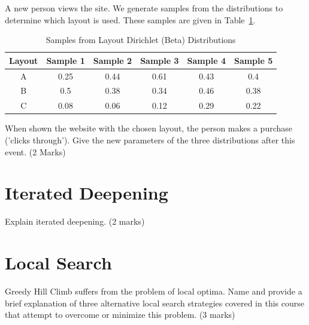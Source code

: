 \documentclass{article}
\begin{document}
A new person views the site. We generate samples from the distributions to determine which layout is used. These samples are given in Table~\ref{MABO2}.
\begin{table}[h!]
\caption{Samples from Layout Dirichlet (Beta) Distributions}
\label{MABO2}
\begin{center}
\begin{tabular}{ |c|c|c|c|c|c| } 
\hline
 Layout & Sample 1 & Sample 2 & Sample 3 & Sample 4 & Sample 5 \\
\hline
A &  0.25  &  0.44  &  0.61  &  0.43  &  0.4 \\
B &  0.5  &  0.38  &  0.34  &  0.46  &  0.38 \\
C &  0.08  &  0.06  &  0.12  &  0.29  &  0.22 \\
\hline
\end{tabular}
\end{center}
\end{table}


When shown the website with the chosen layout, the person makes a purchase ('clicks through'). Give the new parameters of the three distributions after this event. (2 Marks)
\clearpage
\section{ Iterated Deepening }

Explain iterated deepening. (2 marks)
\clearpage
\section{ Local Search }

Greedy Hill Climb suffers from the problem of local optima. Name and provide a brief explanation of three alternative local search strategies covered in this course that attempt to overcome or minimize this problem. (3 marks)
\end{document}
